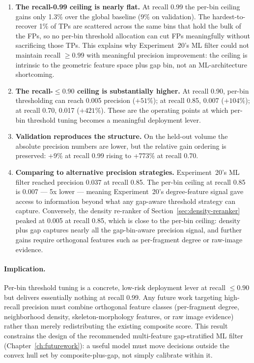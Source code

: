 \begin{enumerate}
  \item \textbf{The recall-0.99 ceiling is nearly flat.}  At recall 0.99
        the per-bin ceiling gains only 1.3\% over the global baseline
        (9\% on validation).  The hardest-to-recover 1\% of TPs are
        scattered across the same bins that hold the bulk of the FPs, so
        no per-bin threshold allocation can cut FPs meaningfully without
        sacrificing those TPs.  This explains why Experiment~20's ML
        filter could not maintain recall $\geq 0.99$ with meaningful
        precision improvement: the ceiling is intrinsic to the
        geometric feature space plus gap bin, not an ML-architecture
        shortcoming.

  \item \textbf{The recall-$\leq 0.90$ ceiling is substantially higher.}
        At recall 0.90, per-bin thresholding can reach 0.005 precision
        ($+51\%$); at recall 0.85, 0.007 ($+104\%$); at recall 0.70,
        0.017 ($+421\%$).  These are the operating points at which
        per-bin threshold tuning becomes a meaningful deployment lever.

  \item \textbf{Validation reproduces the structure.}  On the held-out
        volume the absolute precision numbers are lower, but the
        relative gain ordering is preserved: +9\% at recall 0.99 rising
        to +773\% at recall 0.70.

  \item \textbf{Comparing to alternative precision strategies.}
        Experiment~20's ML filter reached precision 0.037 at recall
        0.85.  The per-bin ceiling at recall 0.85 is 0.007 --- 5x
        lower --- meaning Experiment~20's degree-feature signal gave
        access to information beyond what any gap-aware threshold
        strategy can capture.  Conversely, the density re-ranker of
        Section~\ref{sec:density-reranker} peaked at 0.005 at recall
        0.85, which is close to the per-bin ceiling: density
        plus gap captures nearly all the gap-bin-aware precision
        signal, and further gains require orthogonal features such
        as per-fragment degree or raw-image evidence.
\end{enumerate}

\paragraph{Implication.}
Per-bin threshold tuning is a concrete, low-risk deployment lever at
recall $\leq 0.90$ but delivers essentially nothing at recall 0.99.
Any future work targeting high-recall precision must combine
orthogonal feature classes (per-fragment degree, neighborhood density,
skeleton-morphology features, or raw image evidence) rather than
merely redistributing the existing composite score.  This result
constrains the design of the recommended multi-feature gap-stratified
ML filter (Chapter~\ref{ch:futurework}): a useful model must move
decisions outside the convex hull set by composite-plus-gap, not simply
calibrate within it.

